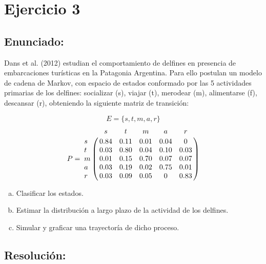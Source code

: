 \documentclass{article}
\begin{document}
\section*{Ejercicio 3}
\subsection*{Enunciado:}
Dans et al. (2012) estudian el comportamiento de delfines en presencia de embarcaciones turísticas en la Patagonia Argentina. Para ello postulan un modelo de cadena de Markov, con espacio de estados conformado por las 5 actividades primarias de los delfines: socializar (s), viajar (t), merodear (m), alimentarse (f), descansar (r), obteniendo la siguiente matriz de transición:


$$ E = \{ s,t,m,a,r\} $$
$$
P = 
\bordermatrix{ 
\text{} & s & t & m & a & r\cr
s&0.84&0.11&0.01&0.04&0 \cr
t&0.03&0.80&0.04&0.10&0.03 \cr
m&0.01&0.15&0.70&0.07&0.07 \cr
a&0.03&0.19&0.02&0.75&0.01 \cr
r&0.03&0.09&0.05&0&0.83 
}
$$



\begin{enumerate}[(a)] 

\item Clasificar los estados.
\item Estimar la distribución a largo plazo de la actividad de los delfines.
\item Simular y graficar una trayectoría de dicho proceso.
\end{enumerate}

\subsection*{Resolución:}
\end{document}
